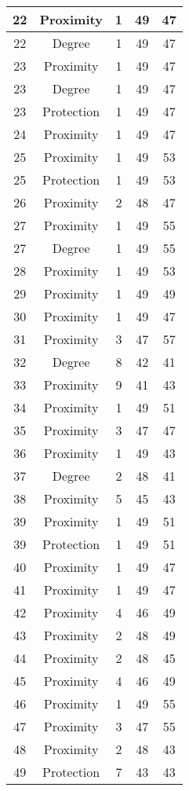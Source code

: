 \documentclass[results.tex]{subfiles}
\begin{document}
\begin{center}
\begin{tabular}{| c || c | c | c | c |}
    \hline
    22 & Proximity & 1 & 49 & 47 \\ 
    \hline
    22 & Degree & 1 & 49 & 47 \\ 
    \hline
    23 & Proximity & 1 & 49 & 47 \\ 
    \hline
    23 & Degree & 1 & 49 & 47 \\ 
    \hline
    23 & Protection & 1 & 49 & 47 \\ 
    \hline
    24 & Proximity & 1 & 49 & 47 \\ 
    \hline
    25 & Proximity & 1 & 49 & 53 \\ 
    \hline
    25 & Protection & 1 & 49 & 53 \\ 
    \hline
    26 & Proximity & 2 & 48 & 47 \\ 
    \hline
    27 & Proximity & 1 & 49 & 55 \\ 
    \hline
    27 & Degree & 1 & 49 & 55 \\ 
    \hline
    28 & Proximity & 1 & 49 & 53 \\ 
    \hline
    29 & Proximity & 1 & 49 & 49 \\ 
    \hline
    30 & Proximity & 1 & 49 & 47 \\ 
    \hline
    31 & Proximity & 3 & 47 & 57 \\ 
    \hline
    32 & Degree & 8 & 42 & 41 \\ 
    \hline
    33 & Proximity & 9 & 41 & 43 \\ 
    \hline
    34 & Proximity & 1 & 49 & 51 \\ 
    \hline
    35 & Proximity & 3 & 47 & 47 \\ 
    \hline
    36 & Proximity & 1 & 49 & 43 \\ 
    \hline
    37 & Degree & 2 & 48 & 41 \\ 
    \hline
    38 & Proximity & 5 & 45 & 43 \\ 
    \hline
    39 & Proximity & 1 & 49 & 51 \\ 
    \hline
    39 & Protection & 1 & 49 & 51 \\ 
    \hline
    40 & Proximity & 1 & 49 & 47 \\ 
    \hline
    41 & Proximity & 1 & 49 & 47 \\ 
    \hline
    42 & Proximity & 4 & 46 & 49 \\ 
    \hline
    43 & Proximity & 2 & 48 & 49 \\ 
    \hline
    44 & Proximity & 2 & 48 & 45 \\ 
    \hline
    45 & Proximity & 4 & 46 & 49 \\ 
    \hline
    46 & Proximity & 1 & 49 & 55 \\ 
    \hline
    47 & Proximity & 3 & 47 & 55 \\ 
    \hline
    48 & Proximity & 2 & 48 & 43 \\ 
    \hline
    49 & Protection & 7 & 43 & 43 \\ 
    \hline   \end{tabular}
\end{center}
\end{document}
